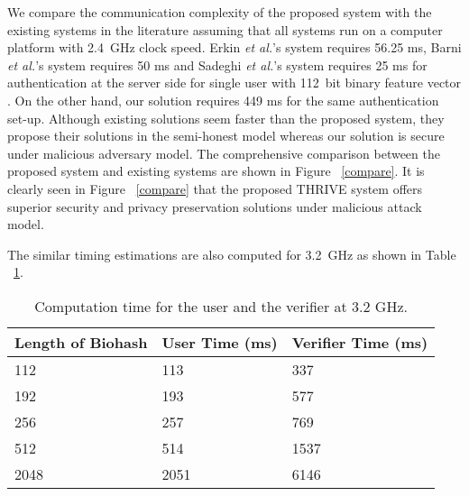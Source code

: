 \documentclass[journal]{IEEEtran}
\begin{document}
We compare the communication complexity of the proposed system with the existing systems in the literature assuming that all systems run on a computer platform with 2.4~GHz clock speed. Erkin \textit {et al.}'s system \cite{Erkin} requires 56.25 ms, Barni \textit {et al.}'s system \cite{Barni, Barni2} requires 50 ms and Sadeghi \textit {et al.}'s system \cite{Sadeghi} requires 25 ms for authentication at the server side for single user with 112~bit binary feature vector \cite{Barni}. On the other hand, our solution requires 449 ms for the same authentication set-up. Although existing solutions seem faster than the proposed system, they propose their solutions in the semi-honest model whereas our solution is secure under malicious adversary model. The comprehensive comparison between the proposed system and existing systems are shown in Figure ~\ref{compare}. It is clearly seen in Figure ~\ref{compare} that the proposed THRIVE system offers superior security and privacy preservation solutions under malicious attack model.

The similar timing estimations are also computed for 3.2~GHz as shown in Table ~\ref{user_time2}.

\begin{table}[h]
    \caption{Computation time for the user and the verifier at 3.2 GHz.}
\label{user_time2}
\begin{tabular}{|p{2.3cm}|p{2.5cm}|p{2.5cm}|}
    \hline
    Length of Biohash & User Time (ms) & Verifier Time (ms) \\ \hline
    112               & 113                          & 337                      \\ \hline
    192               & 193                          & 577                      \\ \hline
    256               & 257                          & 769                       \\ \hline
    512               & 514                          & 1537                      \\ \hline
    2048             & 2051                         & 6146                      \\ \hline
    \end{tabular}
\end{table}
\end{document}
